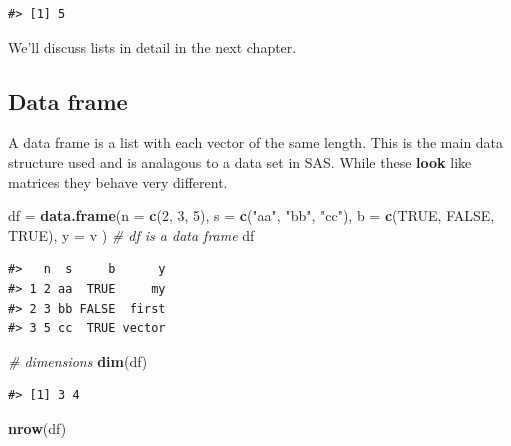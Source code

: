 \documentclass[]{book}
\newenvironment{Shaded}{\begin{snugshade}}{\end{snugshade}}
\newcommand{\KeywordTok}[1]{\textcolor[rgb]{0.13,0.29,0.53}{\textbf{#1}}}
\newcommand{\DataTypeTok}[1]{\textcolor[rgb]{0.13,0.29,0.53}{#1}}
\newcommand{\DecValTok}[1]{\textcolor[rgb]{0.00,0.00,0.81}{#1}}
\newcommand{\StringTok}[1]{\textcolor[rgb]{0.31,0.60,0.02}{#1}}
\newcommand{\CommentTok}[1]{\textcolor[rgb]{0.56,0.35,0.01}{\textit{#1}}}
\newcommand{\OtherTok}[1]{\textcolor[rgb]{0.56,0.35,0.01}{#1}}
\newcommand{\NormalTok}[1]{#1}
\theoremstyle{definition}
\theoremstyle{definition}
\theoremstyle{definition}
\theoremstyle{remark}
\begin{document}
\begin{verbatim}
#> [1] 5
\end{verbatim}

We'll discuss lists in detail in the next chapter.

\subsection{Data frame}\label{data-frame}

A data frame is a list with each vector of the same length. This is the
main data structure used and is analagous to a data set in SAS. While
these \textbf{look} like matrices they behave very different.

\begin{Shaded}
\begin{Highlighting}[]
\NormalTok{df =}\StringTok{ }\KeywordTok{data.frame}\NormalTok{(}\DataTypeTok{n =} \KeywordTok{c}\NormalTok{(}\DecValTok{2}\NormalTok{, }\DecValTok{3}\NormalTok{, }\DecValTok{5}\NormalTok{),}
                \DataTypeTok{s =} \KeywordTok{c}\NormalTok{(}\StringTok{"aa"}\NormalTok{, }\StringTok{"bb"}\NormalTok{, }\StringTok{"cc"}\NormalTok{),}
                \DataTypeTok{b =} \KeywordTok{c}\NormalTok{(}\OtherTok{TRUE}\NormalTok{, }\OtherTok{FALSE}\NormalTok{, }\OtherTok{TRUE}\NormalTok{),}
                \DataTypeTok{y =}\NormalTok{ v}
\NormalTok{                )       }\CommentTok{# df is a data frame }
\NormalTok{df}
\end{Highlighting}
\end{Shaded}

\begin{verbatim}
#>   n  s     b      y
#> 1 2 aa  TRUE     my
#> 2 3 bb FALSE  first
#> 3 5 cc  TRUE vector
\end{verbatim}

\begin{Shaded}
\begin{Highlighting}[]
\CommentTok{# dimensions}
\KeywordTok{dim}\NormalTok{(df)}
\end{Highlighting}
\end{Shaded}

\begin{verbatim}
#> [1] 3 4
\end{verbatim}

\begin{Shaded}
\begin{Highlighting}[]
\KeywordTok{nrow}\NormalTok{(df)}
\end{Highlighting}
\end{Shaded}
\end{document}
